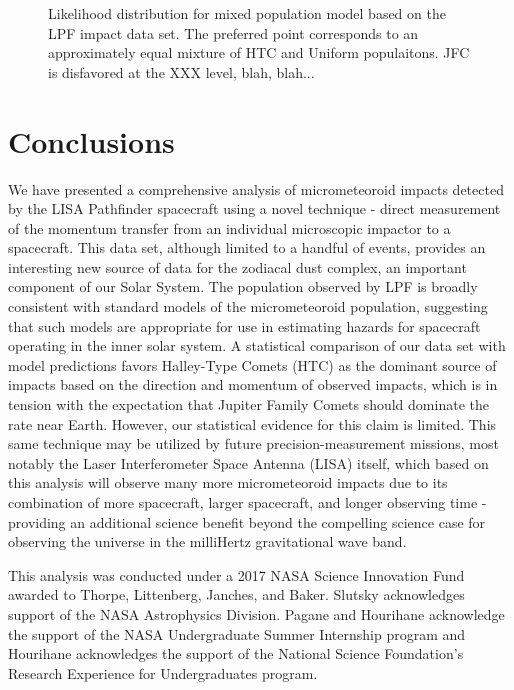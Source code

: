 \documentclass[twocolumn, trackchanges]{aastex61}
\begin{document}
\begin{figure}
\caption{Likelihood distribution for mixed population model based on the LPF impact data set. The preferred point corresponds to an approximately equal mixture of HTC and Uniform populaitons.  JFC is disfavored at the XXX level, blah, blah...\label{fig:Example}}
\end{figure}
\FloatBarrier
\section{Conclusions} \label{sec:conclusions}
We have presented a comprehensive analysis of micrometeoroid impacts detected by the LISA Pathfinder spacecraft using a novel technique - direct measurement of the momentum transfer from an individual microscopic impactor to a spacecraft. This data set, although limited to a handful of events, provides an interesting new source of data for the zodiacal dust complex, an important component of our Solar System.  The population observed by LPF is broadly consistent with standard models of the micrometeoroid population, suggesting that such models are appropriate for use in estimating hazards for spacecraft operating in the inner solar system.  A statistical comparison of our data set with model predictions favors Halley-Type Comets (HTC) as the dominant source of impacts based on the direction and momentum of observed impacts, which is in tension with the expectation that Jupiter Family Comets should dominate the rate near Earth. However, our statistical evidence for this claim is limited.  This same technique may be utilized by future precision-measurement missions, most notably the Laser Interferometer Space Antenna (LISA) itself, which based on this analysis will observe many more micrometeoroid impacts due to its combination of more spacecraft, larger spacecraft, and longer observing time - providing an additional science benefit beyond the compelling science case for observing the universe in the milliHertz gravitational wave band.

\acknowledgments

This analysis was conducted under a 2017 NASA Science Innovation Fund awarded to Thorpe, Littenberg, Janches, and Baker. Slutsky acknowledges support of the NASA Astrophysics Division. Pagane and Hourihane acknowledge the support of the NASA Undergraduate Summer Internship program and Hourihane acknowledges the support of the National Science Foundation's Research Experience for Undergraduates program.
\\
\end{document}
